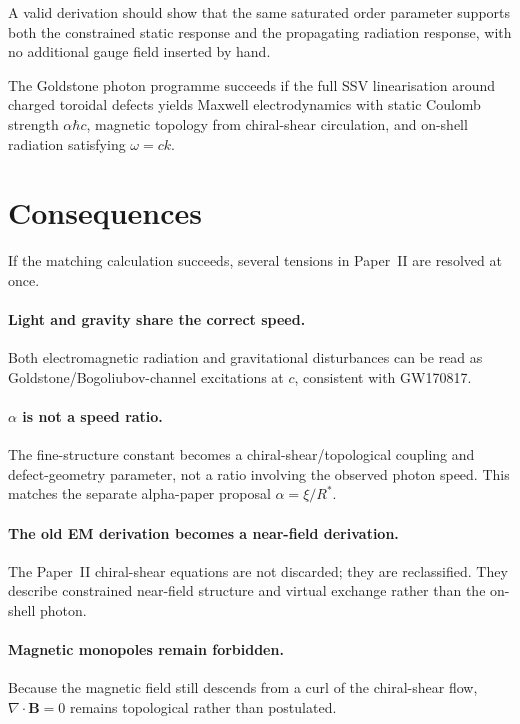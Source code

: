 \documentclass[11pt,a4paper]{article}
\begin{document}
A valid derivation should show that the same saturated order parameter
supports both the constrained static response and the propagating radiation
response, with no additional gauge field inserted by hand.

\begin{resultbox}
The Goldstone photon programme succeeds if the full SSV linearisation around
charged toroidal defects yields Maxwell electrodynamics with static Coulomb
strength $\alpha\hbar c$, magnetic topology from chiral-shear circulation,
and on-shell radiation satisfying $\omega=ck$.
\end{resultbox}

\section{Consequences}
\label{sec:consequences}

If the matching calculation succeeds, several tensions in Paper~II are
resolved at once.

\paragraph{Light and gravity share the correct speed.}
Both electromagnetic radiation and gravitational disturbances can be read
as Goldstone/Bogoliubov-channel excitations at $c$, consistent with
GW170817.

\paragraph{\texorpdfstring{$\alpha$}{alpha} is not a speed ratio.}
The fine-structure constant becomes a chiral-shear/topological coupling and
defect-geometry parameter, not a ratio involving the observed photon speed.
This matches the separate alpha-paper proposal
$\alpha=\xi/R^*$.

\paragraph{The old EM derivation becomes a near-field derivation.}
The Paper~II chiral-shear equations are not discarded; they are reclassified.
They describe constrained near-field structure and virtual exchange rather
than the on-shell photon.

\paragraph{Magnetic monopoles remain forbidden.}
Because the magnetic field still descends from a curl of the chiral-shear
flow, $\nabla\cdot\mathbf{B}=0$ remains topological rather than postulated.
\end{document}
